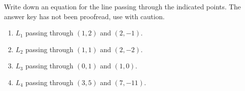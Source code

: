 Write down an equation for the line passing through the indicated points. The answer key has not been proofread, use with caution.

\begin{enumerate}[ref={\fcProblemRef}]
\item $L_1$ passing through $(1,2)$ and $(2,-1)$.

\item $L_2$ passing through $(1,1)$ and $(2,-2)$.

\item $L_3$ passing through $(0,1)$ and $(1,0)$.

\item $L_4$ passing through $(3,5)$ and $(7,-11)$.

\end{enumerate}
